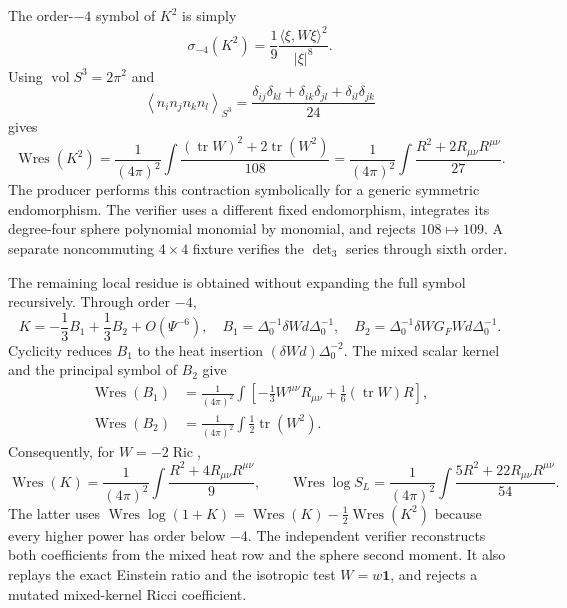 \documentclass[11pt]{article}
\theoremstyle{definition}
\theoremstyle{remark}
\begin{document}
The order-$-4$ symbol of $K^2$ is simply
\[
 \sigma_{-4}(K^2)=\frac19\frac{\langle\xi,W\xi\rangle^2}{|\xi|^8}.
\]
Using $\operatorname{vol}S^3=2\pi^2$ and
\[
 \left\langle n_i n_j n_k n_l\right\rangle_{S^3}
 =\frac{\delta_{ij}\delta_{kl}+\delta_{ik}\delta_{jl}
 +\delta_{il}\delta_{jk}}{24}
\]
gives
\[
 \operatorname{Wres}(K^2)
 =\frac1{(4\pi)^2}\int
 \frac{(\operatorname{tr}W)^2+2\operatorname{tr}(W^2)}{108}
 =\frac1{(4\pi)^2}\int
 \frac{R^2+2R_{\mu\nu}R^{\mu\nu}}{27}.
\]
The producer performs this contraction symbolically for a generic symmetric
endomorphism.  The verifier uses a different fixed endomorphism, integrates
its degree-four sphere polynomial monomial by monomial, and rejects
$108\mapsto109$.  A separate noncommuting $4\times4$ fixture verifies the
$\det_3$ series through sixth order.

The remaining local residue is obtained without expanding the full symbol
recursively.  Through order $-4$,
\[
 K=-\frac13B_1+\frac13B_2+O(\Psi^{-6}),\quad
 B_1=\Delta_0^{-1}\delta Wd\Delta_0^{-1},\quad
 B_2=\Delta_0^{-1}\delta W G_FWd\Delta_0^{-1}.
\]
Cyclicity reduces $B_1$ to the heat insertion
$(\delta Wd)\Delta_0^{-2}$.  The mixed scalar kernel and the principal symbol
of $B_2$ give
\begin{align*}
 \operatorname{Wres}(B_1)
 &=\frac1{(4\pi)^2}\int
   \left[-\frac13W^{\mu\nu}R_{\mu\nu}
          +\frac16(\operatorname{tr}W)R\right],\\
 \operatorname{Wres}(B_2)
 &=\frac1{(4\pi)^2}\int\frac12\operatorname{tr}(W^2).
\end{align*}
Consequently, for $W=-2\operatorname{Ric}$,
\[
 \operatorname{Wres}(K)=\frac1{(4\pi)^2}\int
 \frac{R^2+4R_{\mu\nu}R^{\mu\nu}}9,
 \qquad
 \operatorname{Wres}\log S_L=\frac1{(4\pi)^2}\int
 \frac{5R^2+22R_{\mu\nu}R^{\mu\nu}}{54}.
\]
The latter uses $\operatorname{Wres}\log(1+K)=\operatorname{Wres}(K)
-\tfrac12\operatorname{Wres}(K^2)$ because every higher power has order
below $-4$.  The independent verifier reconstructs both coefficients from
the mixed heat row and the sphere second moment.  It also replays the exact
Einstein ratio and the isotropic test $W=w\mathbf1$, and rejects a mutated
mixed-kernel Ricci coefficient.
\end{document}
